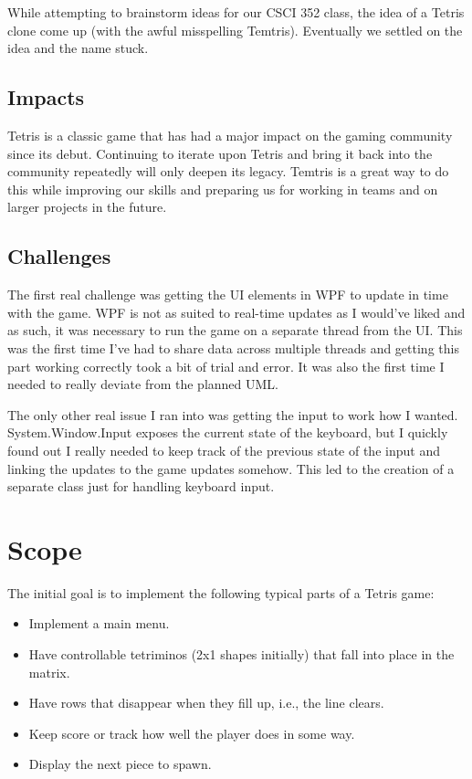 \documentclass[10pt,conference,onecolumn,compsoc]{IEEEtran}
\begin{document}
While attempting to brainstorm ideas for our CSCI 352 class, the idea of a Tetris clone come up (with the awful misspelling Temtris). Eventually we settled on the idea and the name stuck.

\subsection{Impacts}
Tetris is a classic game that has had a major impact on the gaming community since its debut. Continuing to iterate upon Tetris and bring it back into the community repeatedly will only deepen its legacy. Temtris is a great way to  do this while improving our skills and preparing us for working in teams and on larger projects in the future.

\subsection{Challenges}
The first real challenge was getting the UI elements in WPF to update in time with the game. WPF is not as suited to real-time updates as I would've liked and as such, it was necessary to run the game on a separate thread from the UI. This was the first time I've had to share data across multiple threads and getting this part working correctly took a bit of trial and error. It was also the first time I needed to really deviate from the planned UML.

The only other real issue I ran into was getting the input to work how I wanted. System.Window.Input exposes the current state of the keyboard, but I quickly found out I really needed to keep track of the previous state of the input and linking the updates to the game updates somehow. This led to the creation of a separate class just for handling keyboard input.

\section{Scope}
The initial goal is to implement the following typical parts of a Tetris game: 
\begin{itemize}
\item Implement a main menu.
\item Have controllable tetriminos (2x1 shapes initially) that fall into place in the matrix. 
\item Have rows that disappear when they fill up, i.e., the line clears.
\item Keep score or track how well the player does in some way.
\item Display the next piece to spawn.
\end{itemize}
\end{document}
